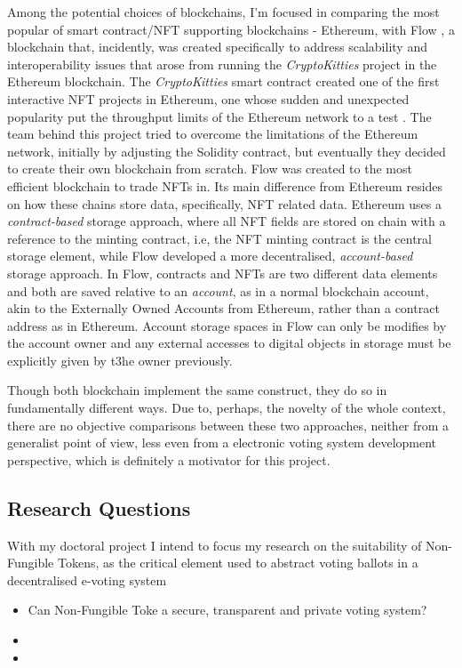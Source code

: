 \documentclass[../main.tex]{subfiles}
\begin{document}
\par
Among the potential choices of blockchains, I'm focused in comparing the most popular of smart contract/NFT supporting blockchains - Ethereum, with Flow \cite{Flow2020a}, a blockchain that, incidently, was created specifically to address scalability and interoperability issues that arose from running the \textit{CryptoKitties} project in the Ethereum blockchain. The \textit{CryptoKitties} smart contract created one of the first interactive NFT projects in Ethereum, one whose sudden and unexpected popularity put the throughput limits of the Ethereum network to a test \cite{bbc2017}. The team behind this project tried to overcome the limitations of the Ethereum network, initially by adjusting the Solidity contract, but eventually they decided to create their own blockchain from scratch. Flow was created to the most efficient blockchain to trade NFTs in. Its main difference from Ethereum resides on how these chains store data, specifically, NFT related data. Ethereum uses a \textit{contract-based} storage approach, where all NFT fields are stored on chain with a reference to the minting contract, i.e, the NFT minting contract is the central storage element, while Flow developed a more decentralised, \textit{account-based} storage approach. In Flow, contracts and NFTs are two different data elements and both are saved relative to an \textit{account}, as in a normal blockchain account, akin to the Externally Owned Accounts from Ethereum, rather than a contract address as in Ethereum. Account storage spaces in Flow can only be modifies by the account owner and any external accesses to digital objects in storage must be explicitly given by t3he owner previously.
\par
Though both blockchain implement the same construct, they do so in fundamentally different ways. Due to, perhaps, the novelty of the whole context, there are no objective comparisons between these two approaches, neither from a generalist point of view, less even from a electronic voting system development perspective, which is definitely a motivator for this project.

\subsection{Research Questions}
With my doctoral project I intend to focus my research on the suitability of Non-Fungible Tokens, as the critical element used to abstract voting ballots in a decentralised e-voting system
\begin{itemize}
    \item {Can Non-Fungible Toke a secure, transparent and private voting system?}
    \item {}
    \item
\end{itemize}
\end{document}
